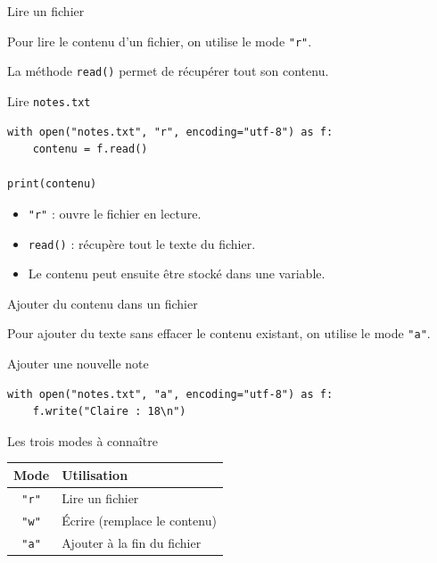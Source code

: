 \documentclass[10pt]{beamer}
\begin{document}
\begin{frame}[fragile]{Lire un fichier}

Pour lire le contenu d'un fichier, on utilise le mode \texttt{"r"}.

La méthode \texttt{read()} permet de récupérer tout son contenu.

\begin{exampleblock}{Lire \texttt{notes.txt}}
\small
\begin{lstlisting}
with open("notes.txt", "r", encoding="utf-8") as f:
    contenu = f.read()

print(contenu)
\end{lstlisting}
\end{exampleblock}

\begin{itemize}
    \item \texttt{"r"} : ouvre le fichier en lecture.
    \item \texttt{read()} : récupère tout le texte du fichier.
    \item Le contenu peut ensuite être stocké dans une variable.
\end{itemize}

\end{frame}
\begin{frame}[fragile]{Ajouter du contenu dans un fichier}

Pour ajouter du texte sans effacer le contenu existant,
on utilise le mode \texttt{"a"}.

\begin{exampleblock}{Ajouter une nouvelle note}
\small
\begin{lstlisting}
with open("notes.txt", "a", encoding="utf-8") as f:
    f.write("Claire : 18\n")
\end{lstlisting}
\end{exampleblock}

\begin{block}{Les trois modes à connaître}
\small
\begin{center}
\begin{tabular}{c|l}
\textbf{Mode} & \textbf{Utilisation} \\
\hline
\texttt{"r"} & Lire un fichier \\
\texttt{"w"} & Écrire (remplace le contenu) \\
\texttt{"a"} & Ajouter à la fin du fichier
\end{tabular}
\end{center}
\end{block}

\end{frame}
\end{document}
